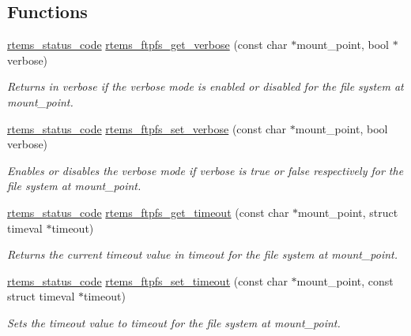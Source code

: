 \subsection*{Functions}
\begin{DoxyCompactItemize}
\item 
\mbox{\hyperlink{group__ClassicStatus_ga545d41846817eaba6143d52ee4d9e9fe}{rtems\+\_\+status\+\_\+code}} \mbox{\hyperlink{group__rtems__ftpfs_gaf963f45e8ceb6fe79e7a8c8e8a7a3827}{rtems\+\_\+ftpfs\+\_\+get\+\_\+verbose}} (const char $\ast$mount\+\_\+point, bool $\ast$verbose)
\begin{DoxyCompactList}\small\item\em Returns in {\itshape verbose} if the verbose mode is enabled or disabled for the file system at {\itshape mount\+\_\+point}. \end{DoxyCompactList}\item 
\mbox{\hyperlink{group__ClassicStatus_ga545d41846817eaba6143d52ee4d9e9fe}{rtems\+\_\+status\+\_\+code}} \mbox{\hyperlink{group__rtems__ftpfs_ga1b9eb4fa9eb72fe2218ee7448a7e970a}{rtems\+\_\+ftpfs\+\_\+set\+\_\+verbose}} (const char $\ast$mount\+\_\+point, bool verbose)
\begin{DoxyCompactList}\small\item\em Enables or disables the verbose mode if {\itshape verbose} is {\ttfamily true} or {\ttfamily false} respectively for the file system at {\itshape mount\+\_\+point}. \end{DoxyCompactList}\item 
\mbox{\hyperlink{group__ClassicStatus_ga545d41846817eaba6143d52ee4d9e9fe}{rtems\+\_\+status\+\_\+code}} \mbox{\hyperlink{group__rtems__ftpfs_ga6dde83f58606a122aec703001c59c571}{rtems\+\_\+ftpfs\+\_\+get\+\_\+timeout}} (const char $\ast$mount\+\_\+point, struct timeval $\ast$timeout)
\begin{DoxyCompactList}\small\item\em Returns the current timeout value in {\itshape timeout} for the file system at {\itshape mount\+\_\+point}. \end{DoxyCompactList}\item 
\mbox{\hyperlink{group__ClassicStatus_ga545d41846817eaba6143d52ee4d9e9fe}{rtems\+\_\+status\+\_\+code}} \mbox{\hyperlink{group__rtems__ftpfs_gaadeae39927ef1277b2ac47c6e796a07c}{rtems\+\_\+ftpfs\+\_\+set\+\_\+timeout}} (const char $\ast$mount\+\_\+point, const struct timeval $\ast$timeout)
\begin{DoxyCompactList}\small\item\em Sets the timeout value to {\itshape timeout} for the file system at {\itshape mount\+\_\+point}. \end{DoxyCompactList}\end{DoxyCompactItemize}


